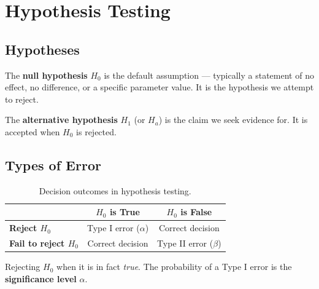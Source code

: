 \chapter{Hypothesis Testing}

\section{Hypotheses}

\begin{definition}
The \textbf{null hypothesis} $H_0$ is the default assumption — typically a statement of
no effect, no difference, or a specific parameter value. It is the hypothesis we attempt
to reject.
\end{definition}

\begin{definition}
The \textbf{alternative hypothesis} $H_1$ (or $H_a$) is the claim we seek evidence for.
It is accepted when $H_0$ is rejected.
\end{definition}

\section{Types of Error}

\begin{table}[h!]
\centering
\renewcommand{\arraystretch}{1.5}
\begin{tabular}{lcc}
\toprule
 & \textbf{$H_0$ is True} & \textbf{$H_0$ is False} \\
\midrule
\textbf{Reject $H_0$}     & Type I error ($\alpha$) & Correct decision \\
\textbf{Fail to reject $H_0$} & Correct decision    & Type II error ($\beta$) \\
\bottomrule
\end{tabular}
\caption{Decision outcomes in hypothesis testing.}
\end{table}

\begin{definition}
Rejecting $H_0$ when it is in fact \emph{true}. The probability of a Type I error is the
\textbf{significance level} $\alpha$.
\end{definition}

